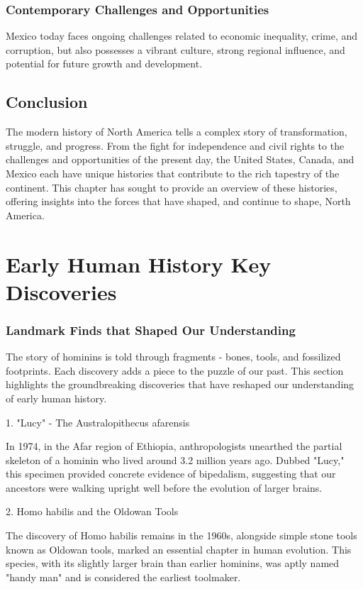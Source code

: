 \documentclass[a4paper,12pt]{book}
\begin{document}
\subsection{Contemporary Challenges and Opportunities}
Mexico today faces ongoing challenges related to economic inequality, crime, and corruption, but also possesses a vibrant culture, strong regional influence, and potential for future growth and development.

\section{Conclusion}
\label{sec:conclusion-north-america-modern}
The modern history of North America tells a complex story of transformation, struggle, and progress. From the fight for independence and civil rights to the challenges and opportunities of the present day, the United States, Canada, and Mexico each have unique histories that contribute to the rich tapestry of the continent. This chapter has sought to provide an overview of these histories, offering insights into the forces that have shaped, and continue to shape, North America.




\chapter{Early Human History Key Discoveries}
\subsection*{Landmark Finds that Shaped Our Understanding}
The story of hominins is told through fragments - bones, tools, and fossilized footprints. Each discovery adds a piece to the puzzle of our past. This section highlights the groundbreaking discoveries that have reshaped our understanding of early human history.

1. "Lucy" - The Australopithecus afarensis

In 1974, in the Afar region of Ethiopia, anthropologists unearthed the partial skeleton of a hominin who lived around 3.2 million years ago. Dubbed "Lucy," this specimen provided concrete evidence of bipedalism, suggesting that our ancestors were walking upright well before the evolution of larger brains.

2. Homo habilis and the Oldowan Tools

The discovery of Homo habilis remains in the 1960s, alongside simple stone tools known as Oldowan tools, marked an essential chapter in human evolution. This species, with its slightly larger brain than earlier hominins, was aptly named "handy man" and is considered the earliest toolmaker.
\end{document}

